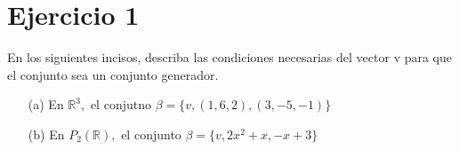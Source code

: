 \section*{Ejercicio 1}

En los siguientes incisos, describa las condiciones necesarias del vector v para que el conjunto sea un
conjunto generador.

\begin{itemize}
    \item[(a)] En $\mathbb{R}^{3},$ el conjutno $\beta = \{ v, (1,6,2), (3,-5,-1) \}$
    \item[(b)] En $P_{2}(\mathbb{R}),$ el conjunto $\beta = \{ v, 2x^{2} + x, -x +3\}$
\end{itemize}